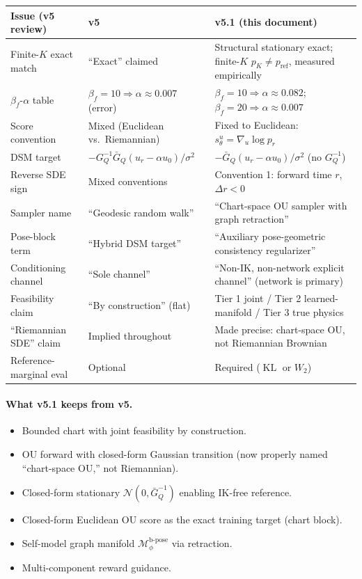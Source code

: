 \documentclass[11pt,a4paper]{article}
\DeclareMathOperator{\KL}{KL}
\newcommand{\N}{\mathcal{N}}
\newcommand{\Mbpose}{\mathcal{M}_\phi^{\text{b-pose}}}
\newcommand{\GQ}{G_Q}
\newcommand{\GQbar}{\bar G_Q}
\begin{document}
\begin{center}
\begin{tabular}{l|p{4.0cm}|p{5.5cm}}
\textbf{Issue (v5 review)} & \textbf{v5} & \textbf{v5.1 (this document)} \\
\hline
Finite-$K$ exact match & ``Exact'' claimed & Structural stationary exact; finite-$K$ $p_K \neq p_\text{ref}$, measured empirically \\
\hline
$\beta_f$-$\alpha$ table & $\beta_f = 10 \Rightarrow \alpha \approx 0.007$ (error) & $\beta_f = 10 \Rightarrow \alpha \approx 0.082$; $\beta_f = 20 \Rightarrow \alpha \approx 0.007$ \\
\hline
Score convention & Mixed (Euclidean vs.\ Riemannian) & Fixed to Euclidean: $s_\theta^u = \nabla_u \log p_r$ \\
\hline
DSM target & $-\GQ^{-1} \GQbar (u_r - \alpha u_0)/\sigma^2$ & $-\GQbar (u_r - \alpha u_0)/\sigma^2$ (no $\GQ^{-1}$) \\
\hline
Reverse SDE sign & Mixed conventions & Convention 1: forward time $r$, $\Delta r < 0$ \\
\hline
Sampler name & ``Geodesic random walk'' & ``Chart-space OU sampler with graph retraction'' \\
\hline
Pose-block term & ``Hybrid DSM target'' & ``Auxiliary pose-geometric consistency regularizer'' \\
\hline
Conditioning channel & ``Sole channel'' & ``Non-IK, non-network explicit channel'' (network is primary) \\
\hline
Feasibility claim & ``By construction'' (flat) & Tier 1 joint / Tier 2 learned-manifold / Tier 3 true physics \\
\hline
``Riemannian SDE'' claim & Implied throughout & Made precise: chart-space OU, not Riemannian Brownian \\
\hline
Reference-marginal eval & Optional & Required ($\KL$ or $W_2$) \\
\end{tabular}
\end{center}

\paragraph{What v5.1 keeps from v5.}
\begin{itemize}[noitemsep]
    \item Bounded chart with joint feasibility by construction.
    \item OU forward with closed-form Gaussian transition (now properly named ``chart-space OU,'' not Riemannian).
    \item Closed-form stationary $\N(0, \GQbar^{-1})$ enabling IK-free reference.
    \item Closed-form Euclidean OU score as the exact training target (chart block).
    \item Self-model graph manifold $\Mbpose$ via retraction.
    \item Multi-component reward guidance.
\end{itemize}
\end{document}
